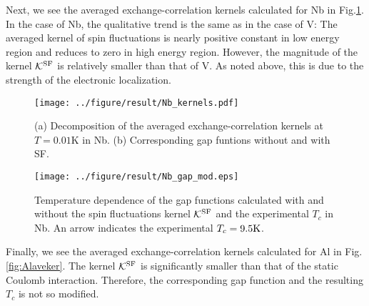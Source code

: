 Next, we see the averaged exchange-correlation kernels calculated for Nb in Fig.\ref{fig:Nbaveker}.
In the case of Nb, the qualitative trend is the same as in the case of V: The averaged kernel of spin fluctuations
is nearly positive constant in low energy region and reduces to zero in high energy region.
However, the magnitude of the kernel $\mathcal K^{\rm SF}$ is relatively smaller than that of V.
As noted above, this is due to the strength of the electronic localization.
%
\begin{figure}[h]
	\centering
	\texttt{[image: ../figure/result/Nb\_kernels.pdf]}
	\caption{(a) Decomposition of the averaged exchange-correlation kernels
		at $T=0.01$K in Nb. (b) Corresponding gap funtions without 
	and with SF.}
	\label{fig:Nbaveker}
\end{figure}
%
\begin{figure}[h]
	\centering
	\texttt{[image: ../figure/result/Nb\_gap\_mod.eps]}
	\caption{Temperature dependence of the gap functions calculated with and without 
		the spin fluctuations kernel $\mathcal K^{\rm SF}$ and the experimental $T_c$ in Nb.
		An arrow indicates the experimental $T_c = 9.5{\rm K}$.}
	\label{fig:NbgapT}
\end{figure}

Finally, we see the averaged exchange-correlation kernels calculated for Al in Fig.\ref{fig:Alaveker}.
The kernel $\mathcal K^{\rm SF}$ is significantly smaller than that of the static Coulomb interaction.
Therefore, the corresponding gap function and the resulting $T_c$ is not so modified.
%
%


